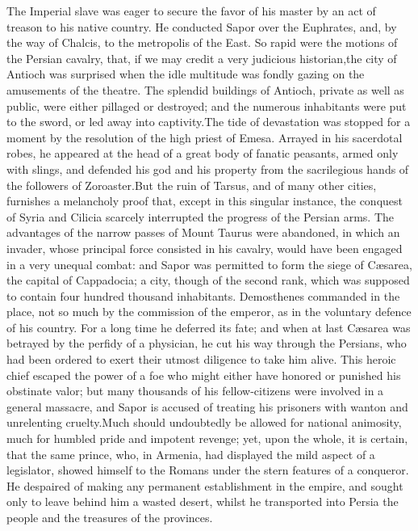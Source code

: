 



The Imperial slave was eager to secure the favor of his master by
an act of treason to his native country. He conducted Sapor over
the Euphrates, and, by the way of Chalcis, to the metropolis of
the East. So rapid were the motions of the Persian cavalry, that,
if we may credit a very judicious historian,\footnotemark[141] the city of
Antioch was surprised when the idle multitude was fondly gazing
on the amusements of the theatre. The splendid buildings of
Antioch, private as well as public, were either pillaged or
destroyed; and the numerous inhabitants were put to the sword, or
led away into captivity.\footnotemark[142] The tide of devastation was stopped
for a moment by the resolution of the high priest of Emesa.
Arrayed in his sacerdotal robes, he appeared at the head of a
great body of fanatic peasants, armed only with slings, and
defended his god and his property from the sacrilegious hands of
the followers of Zoroaster.\footnotemark[143] But the ruin of Tarsus, and of
many other cities, furnishes a melancholy proof that, except in
this singular instance, the conquest of Syria and Cilicia
scarcely interrupted the progress of the Persian arms. The
advantages of the narrow passes of Mount Taurus were abandoned,
in which an invader, whose principal force consisted in his
cavalry, would have been engaged in a very unequal combat: and
Sapor was permitted to form the siege of Cæsarea, the capital of
Cappadocia; a city, though of the second rank, which was supposed
to contain four hundred thousand inhabitants. Demosthenes
commanded in the place, not so much by the commission of the
emperor, as in the voluntary defence of his country. For a long
time he deferred its fate; and when at last Cæsarea was betrayed
by the perfidy of a physician, he cut his way through the
Persians, who had been ordered to exert their utmost diligence to
take him alive. This heroic chief escaped the power of a foe who
might either have honored or punished his obstinate valor; but
many thousands of his fellow-citizens were involved in a general
massacre, and Sapor is accused of treating his prisoners with
wanton and unrelenting cruelty.\footnotemark[144] Much should undoubtedly be
allowed for national animosity, much for humbled pride and
impotent revenge; yet, upon the whole, it is certain, that the
same prince, who, in Armenia, had displayed the mild aspect of a
legislator, showed himself to the Romans under the stern features
of a conqueror. He despaired of making any permanent
establishment in the empire, and sought only to leave behind him
a wasted desert, whilst he transported into Persia the people and
the treasures of the provinces.\footnotemark[145]

